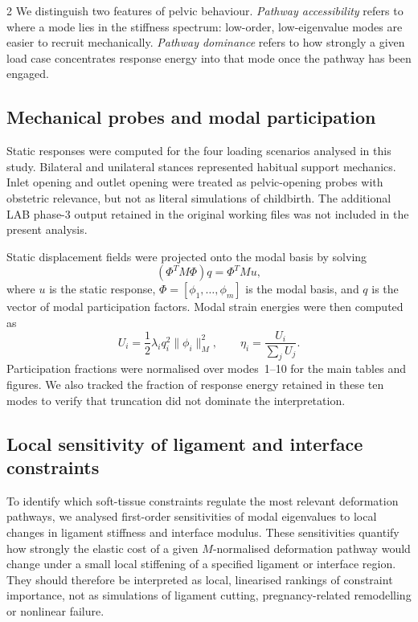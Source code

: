 \documentclass[openacc]{rsproca_new}
\begin{document}
\begin{multicols}{2}
We distinguish two features of pelvic behaviour. \emph{Pathway accessibility} refers to where a mode lies in the stiffness spectrum: low-order, low-eigenvalue modes are easier to recruit mechanically. \emph{Pathway dominance} refers to how strongly a given load case concentrates response energy into that mode once the pathway has been engaged.

\subsection{Mechanical probes and modal participation}

Static responses were computed for the four loading scenarios analysed in this study. Bilateral and unilateral stances represented habitual support mechanics. Inlet opening and outlet opening were treated as pelvic-opening probes with obstetric relevance, but not as literal simulations of childbirth. The additional LAB phase-3 output retained in the original working files was not included in the present analysis.

Static displacement fields were projected onto the modal basis by solving
\begin{equation}
(\Phi^{T}M\Phi)q = \Phi^{T}Mu,
\end{equation}
where $u$ is the static response, $\Phi=[\phi_{1},\ldots,\phi_{m}]$ is the modal basis, and $q$ is the vector of modal participation factors. Modal strain energies were then computed as
\begin{equation}
U_{i}=\frac{1}{2}\lambda_{i}q_{i}^{2}\lVert\phi_{i}\rVert_{M}^{2}, \qquad
\eta_{i}=\frac{U_{i}}{\sum_{j}U_{j}}.
\end{equation}
Participation fractions were normalised over modes~1--10 for the main tables and figures. We also tracked the fraction of response energy retained in these ten modes to verify that truncation did not dominate the interpretation.

\subsection{Local sensitivity of ligament and interface constraints}

To identify which soft-tissue constraints regulate the most relevant deformation pathways, we analysed first-order sensitivities of modal eigenvalues to local changes in ligament stiffness and interface modulus. These sensitivities quantify how strongly the elastic cost of a given $M$-normalised deformation pathway would change under a small local stiffening of a specified ligament or interface region. They should therefore be interpreted as local, linearised rankings of constraint importance, not as simulations of ligament cutting, pregnancy-related remodelling or nonlinear failure.


\end{multicols}
\end{document}

